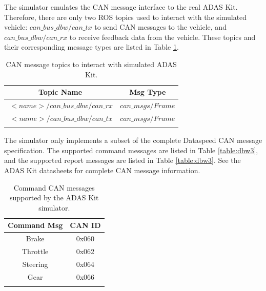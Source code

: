 The simulator emulates the CAN message interface to the real ADAS Kit. Therefore, there are only two ROS topics used to interact with the simulated vehicle: $can\_bus\_dbw / can\_tx$ to send CAN messages to the vehicle, and $can\_bus\_dbw / can\_rx$ to receive feedback data from the vehicle. These topics and their corresponding message types are listed in Table \ref{table:dbw1}.

\begin{table}[h!]
\centering
\begin{tabular}{c c} 
 \hline
 Topic Name & Msg Type \\ [0.5ex] 
 \hline
 $~<name>/can\_bus\_dbw/can\_rx$ & $can\_msgs/Frame$  \\ 
 \hline
 $~<name>/can\_bus\_dbw/can\_tx$ & $can\_msgs/Frame$ \\ [1ex] 
 \hline \\
\end{tabular}
\caption{CAN message topics to interact with simulated ADAS Kit.}
\label{table:dbw1}
\end{table}

The simulator only implements a subset of the complete Dataspeed CAN message specification. The supported command messages are listed in Table \ref{table:dbw3}, and the supported report messages are listed in Table \ref{table:dbw3}. See the ADAS Kit datasheets for complete CAN message information.

\begin{table}[h!]
\centering
\begin{tabular}{c c} 
 \hline
 Command Msg & CAN ID \\ [0.5ex] 
 \hline
 Brake & 0x060 \\ 
 \hline
 Throttle &0x062 \\
  \hline
 Steering & 0x064 \\
 \hline
 Gear & 0x066 \\  [1ex] 
 \hline \\
\end{tabular}
\caption{Command CAN messages supported by the ADAS Kit simulator.}
\label{table:dbw2}
\end{table}

